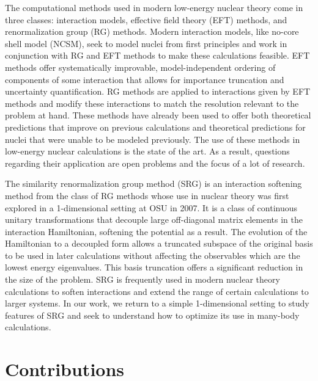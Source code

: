 The computational methods used in modern low-energy nuclear theory come in three classes: interaction models, effective field theory (EFT) methods, and renormalization group (RG) methods. Modern interaction models, like no-core shell model (NCSM), seek to model nuclei from first principles and work in conjunction with RG and EFT methods to make these calculations feasible. EFT methods offer systematically improvable, model-independent ordering of components of some interaction that allows for importance truncation and uncertainty quantification. RG methods are applied to interactions given by EFT methods and modify these interactions to match the resolution relevant to the problem at hand. These methods have already been used to offer both theoretical predictions that improve on previous calculations and theoretical predictions for nuclei that were unable to be modeled previously. The use of these methods in low-energy nuclear calculations is the state of the art. As a result, questions regarding their application are open problems and the focus of a lot of research. %

The similarity renormalization group method (SRG) is an interaction softening method from the class of RG methods whose use in nuclear theory was first explored in a 1-dimensional setting at OSU in 2007. It is a class of continuous unitary transformations that decouple large off-diagonal matrix elements in the interaction Hamiltonian, softening the potential as a result. The evolution of the Hamiltonian to a decoupled form allows a truncated subspace of the original basis to be used in later calculations without affecting the observables which are the lowest energy eigenvalues. This basis truncation offers a significant reduction in the size of the problem. SRG is frequently used in modern nuclear theory calculations to soften interactions and extend the range of certain calculations to larger systems. In our work, we return to a simple 1-dimensional setting to study features of SRG and seek to understand how to optimize its use in many-body calculations.

\section{Contributions}

